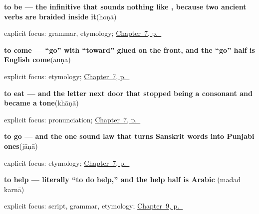 \noindent\begin{minipage}[t]{\linewidth}
\raggedright
\textbf{to be — the infinitive that sounds nothing like , because two ancient verbs are braided inside it}\enspace\emph{}\enspace(hoṇā)\par
\footnotesize explicit focus: grammar, etymology; \hyperref[ch:pa-core-verbs]{Chapter~7, p.~\pageref*{ch:pa-core-verbs}}
\end{minipage}\par\smallskip

\noindent\begin{minipage}[t]{\linewidth}
\raggedright
\textbf{to come — “go” with “toward” glued on the front, and the “go” half is English come}\enspace\emph{}\enspace(āuṇā)\par
\footnotesize explicit focus: etymology; \hyperref[ch:pa-core-verbs]{Chapter~7, p.~\pageref*{ch:pa-core-verbs}}
\end{minipage}\par\smallskip

\noindent\begin{minipage}[t]{\linewidth}
\raggedright
\textbf{to eat — and the letter next door that stopped being a consonant and became a tone}\enspace\emph{}\enspace(khāṇā)\par
\footnotesize explicit focus: pronunciation; \hyperref[ch:pa-core-verbs]{Chapter~7, p.~\pageref*{ch:pa-core-verbs}}
\end{minipage}\par\smallskip

\noindent\begin{minipage}[t]{\linewidth}
\raggedright
\textbf{to go — and the one sound law that turns Sanskrit words into Punjabi ones}\enspace\emph{}\enspace(jāṇā)\par
\footnotesize explicit focus: etymology; \hyperref[ch:pa-core-verbs]{Chapter~7, p.~\pageref*{ch:pa-core-verbs}}
\end{minipage}\par\smallskip

\noindent\begin{minipage}[t]{\linewidth}
\raggedright
\textbf{to help — literally “to do help,” and the help half is Arabic}\enspace\emph{ }\enspace(madad karnā)\par
\footnotesize explicit focus: script, grammar, etymology; \hyperref[ch:pa-taking-and-liking]{Chapter~9, p.~\pageref*{ch:pa-taking-and-liking}}
\end{minipage}\par\smallskip

